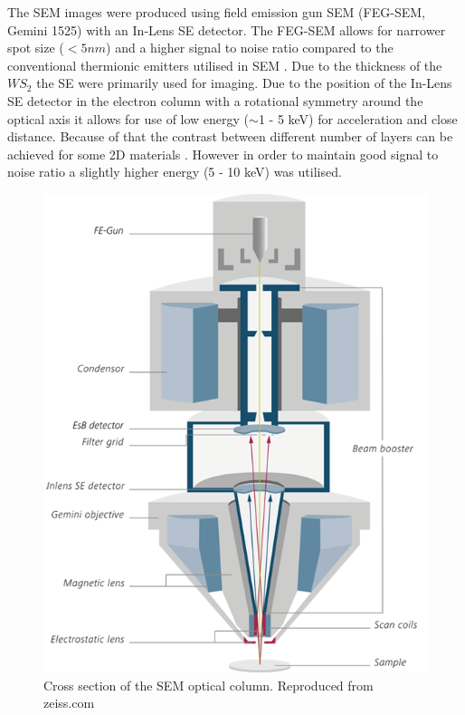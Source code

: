 The SEM images were produced using field emission gun SEM (FEG-SEM, Gemini 1525) with an In-Lens SE detector. The FEG-SEM allows for narrower spot size ($<5 nm$) and a higher signal to noise ratio compared to the conventional thermionic emitters utilised in SEM \cite{Ogura2009}. Due to the thickness of the $WS_2$ the SE were primarily used for imaging. Due to the position of the In-Lens SE detector in the electron column with a rotational symmetry around the optical axis it allows for use of low energy ($\sim$1 - 5 keV) for acceleration and close distance. Because of that the contrast between different number of layers can be achieved for some 2D materials \cite{Kochat2011}. However in order to maintain good signal to noise ratio a slightly higher energy (5 - 10 keV) was utilised.

\begin{figure}[H]
	\begin{center}
		\includegraphics[scale=0.3]{Methodology/SEMSetup.png}
		\caption{Cross section of the SEM optical column. Reproduced from zeiss.com}
		\label{fig:MethodologySEMSetup}
	\end{center}
\end{figure}

